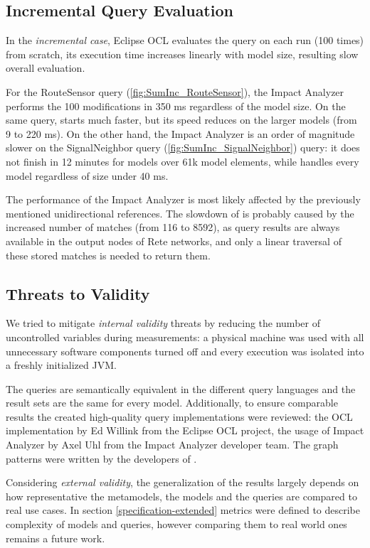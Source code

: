 \subsection{Incremental Query Evaluation}
In the \emph{incremental case}, Eclipse OCL evaluates the query on each run
(100 times) from scratch, its execution time increases linearly with
model size, resulting slow overall evaluation.

For the \textsf{RouteSensor} query (\autoref{fig:SumInc_RouteSensor}), the Impact
Analyzer performs the 100 modifications in 350 ms regardless of the model
size. On the same query, \eiq{} starts much faster, but its speed reduces
on the larger models (from 9 to 220 ms). On the other hand, the Impact
Analyzer is an order of magnitude slower on the \textsf{SignalNeighbor} query
(\autoref{fig:SumInc_SignalNeighbor}) query: it does not finish in 12 minutes
for models over 61k model elements, while \eiq{} handles every model
regardless of size under 40 ms.

The performance of the Impact Analyzer is most likely affected by the previously
mentioned unidirectional references. The slowdown of \eiq{} is probably
caused by the increased number of matches (from 116 to 8592), as query
results are always available in the output nodes of Rete networks, and only a
linear traversal of these stored matches is needed to return them.

\subsection{Threats to Validity}
We tried to mitigate \emph{internal validity} threats by reducing the number of
uncontrolled variables during measurements: a physical machine was used with all
unnecessary software components turned off and every execution was isolated into
a freshly initialized JVM.

The queries are semantically equivalent in the different query languages and the
result sets are the same for every model. Additionally, to ensure comparable
results the created high-quality query implementations were reviewed: the OCL
implementation by Ed Willink from the Eclipse OCL project, the usage of Impact
Analyzer by Axel Uhl from the Impact Analyzer developer team. The graph patterns
were written by the developers of \eiq{}.

Considering \emph{external validity}, the generalization of the results largely
depends on how representative the metamodels, the models and the queries are
compared to real use cases. In section \ref{specification-extended} metrics were
defined to describe complexity of models and queries, however comparing them to
real world ones remains a future work.


